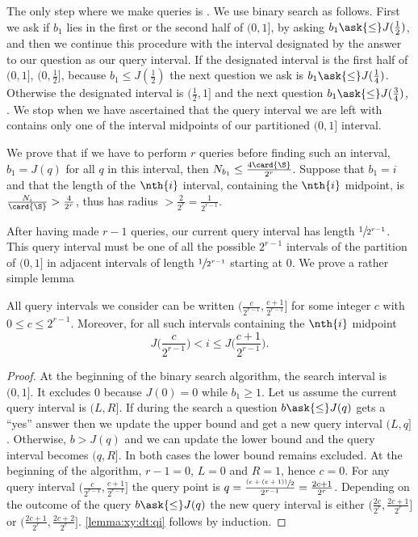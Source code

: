 The only step where we make queries is . We use binary
search as follows. First we ask if $b_1$ lies in the first or the second
half of $(0,1]$, by asking $b_1 \ask{\le} J(\frac{1}{2})$, and then we continue
this procedure with the interval designated by the answer to our question as
our query interval. If the designated interval is the first half of $(0,1]$,
\ie $(0, \frac{1}{2}]$, because $b_1 \le J(\frac{1}{2})$ the next question we
ask is $b_1 \ask{\le} J(\frac{1}{4})$. Otherwise the designated interval
is $(\frac{1}{2},1]$ and the next question $b_1 \ask{\le} J(\frac{3}{4})$,
\etc. We stop when we have ascertained that the query interval we are left with
contains only one of the interval midpoints of our partitioned
$(0,1]$ interval.

We prove that if we have to perform $r$ queries before finding such an
interval, $b_1 = J(q)$ for all $q$ in this interval, then $N_{b_1} \le
\frac{4\card{\S}}{2^r}$. Suppose that $b_1 = i$ and that the length of the
$\nth{i}$ interval, containing the $\nth{i}$ midpoint, is
$\frac{N_i}{\card{\S}} > \frac{4}{2^r}$, thus has radius $> \frac{2}{2^r} =
\frac{1}{2^{r-1}}$.

After having made $r-1$ queries, our current query
interval has length $\sfrac{1}{2^{r-1}}$. This query interval must be one of
all the possible $2^{r-1}$ intervals of the partition of $(0,1]$ in adjacent
intervals of length $\sfrac{1}{2^{r-1}}$ starting at $0$. We prove a rather
simple lemma
\begin{lemma}
\label{lemma:xy:dt:qi}
All query intervals we consider can be written $(\frac{c}{2^{r-1}},
\frac{c+1}{2^{r-1}}]$ for some integer $c$ with $0 \le c \le 2^{r-1}$.
Moreover, for all such intervals containing the \(\nth{i}\) midpoint
\begin{displaymath}
J\bigg(\frac{c}{2^{r-1}}\bigg) < i \le J\bigg(\frac{c+1}{2^{r-1}}\bigg).
\end{displaymath}
\end{lemma}

\begin{proof}
At the beginning of the binary search algorithm, the search interval is
$(0,1]$. It excludes \(0\) because \(J(0) = 0\) while \(b_1 \ge 1\). Let us
assume the current query interval is \((L,R]\). If during the search a
question \(b \ask{\le} J(q)\) gets a ``yes'' answer then we update the upper
bound and get a new query interval \((L,q]\). Otherwise, \(b > J(q)\) and we
can update the lower bound and the query interval becomes \((q,R]\). In both
cases the lower bound remains excluded. At the beginning of the algorithm,
\(r - 1 = 0\), \(L=0\) and \(R=1\), hence \(c = 0\). For any query
interval $(\frac{c}{2^{r-1}}, \frac{c+1}{2^{r-1}}]$ the query point is \(q =
\frac{\sfrac{(c + (c + 1))}{2}}{2^{r-1}} = \frac{2c + 1}{2^r}\). Depending on the
outcome of the query \(b \ask{\le} J(q)\) the new query interval is
either \((\frac{2c}{2^{r}}, \frac{2c+1}{2^{r}}]\) or \((\frac{2c+1}{2^{r}},
\frac{2c+2}{2^{r}}]\). \ref{lemma:xy:dt:qi} follows by induction.
\end{proof}

